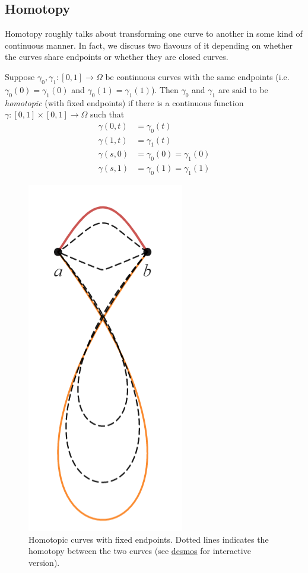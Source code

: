\subsection{Homotopy}
Homotopy roughly talks about transforming one curve to another in some kind of continuous manner. In fact, we discuss two flavours of it depending on whether the curves share endpoints or whether they are closed curves.

\begin{definition}
Suppose $\gamma_0, \gamma_1: [0, 1] \to \Omega$ be continuous curves with the same endpoints (i.e. $\gamma_0(0) = \gamma_1(0)$ and $\gamma_0(1) = \gamma_1(1)$). Then $\gamma_0$ and $\gamma_1$ are said to be \textit{homotopic} (with fixed endpoints) if there is a continuous function $\gamma: [0, 1] \times [0, 1] \to \Omega$ such that
\begin{align*}
    \gamma(0, t) &= \gamma_0(t)\\
    \gamma(1, t) &= \gamma_1(t)\\
    \gamma(s, 0) &= \gamma_0(0) = \gamma_1(0)\\
    \gamma(s, 1) &= \gamma_0(1) = \gamma_1(1)
\end{align*}
\end{definition}
\begin{figure}[ht]
    \centering
    \includegraphics[scale=0.8]{Images/homotopy_example.png}
    \caption{Homotopic curves with fixed endpoints. Dotted lines indicates the homotopy between the two curves (see \href{https://www.desmos.com/calculator/jsdrzz6v0d}{desmos} for interactive version).}
    \label{fig:homotopic-fixed-ends}
\end{figure}

